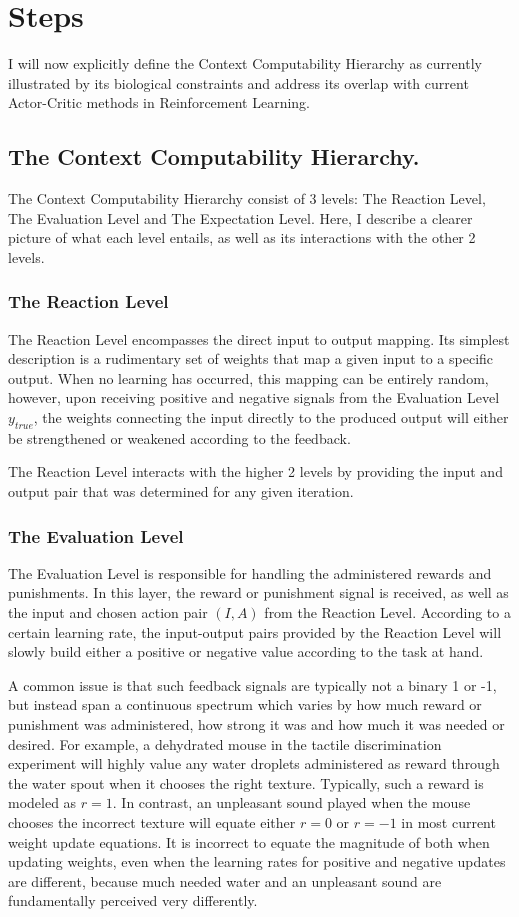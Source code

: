 \documentclass[]{article}
\begin{document}
\section{Steps}
I will now explicitly define the Context Computability Hierarchy as currently illustrated by its biological constraints and address its overlap with current Actor-Critic methods in Reinforcement Learning.

\subsection{The Context Computability Hierarchy.}
The Context Computability Hierarchy consist of 3 levels: The Reaction Level, The Evaluation Level and The Expectation Level.  Here, I describe a clearer picture of what each level entails, as well as its interactions with the other 2 levels.

\subsubsection{The Reaction Level}
The Reaction Level encompasses the direct input to output mapping.  Its simplest description is a rudimentary set of weights that map a given input to a specific output.  When no learning has occurred, this mapping can be entirely random, however, upon receiving positive and negative signals from the Evaluation Level $y_{true}$, the weights connecting the input directly to the produced output will either be strengthened or weakened according to the feedback.

The Reaction Level interacts with the higher 2 levels by providing the input and output pair that was determined for any given iteration.

\subsubsection{The Evaluation Level}
The Evaluation Level is responsible for handling the administered rewards and punishments.  In this layer, the reward or punishment signal is received, as well as the input and chosen action pair $(I, A)$ from the Reaction Level.  According to a certain learning rate, the input-output pairs provided by the Reaction Level will slowly build either a positive or negative value according to the task at hand.

A common issue is that such feedback signals are typically not a binary 1 or -1, but instead span a continuous spectrum which varies by how much reward or punishment was administered, how strong it was and how much it was needed or desired.  For example, a dehydrated mouse in the tactile discrimination experiment will highly value any water droplets administered as reward through the water spout when it chooses the right texture.  Typically, such a reward is modeled as $r = 1$.  In contrast, an unpleasant sound played when the mouse chooses the incorrect texture will equate either $r = 0$ or $r = -1$ in most current weight update equations.  It is incorrect to equate the magnitude of both when updating weights, even when the learning rates for positive and negative updates are different, because much needed water and an unpleasant sound are fundamentally perceived very differently.
\end{document}
